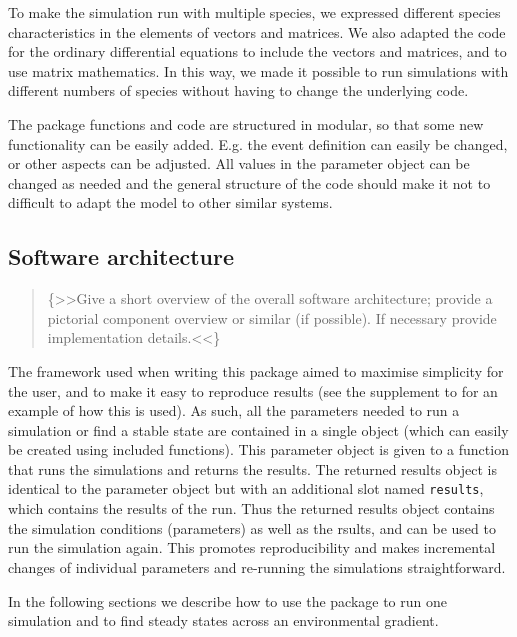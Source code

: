 \documentclass[]{elsarticle} %
\begin{document}
To make the simulation run with multiple species, we expressed different
species characteristics in the elements of vectors and matrices. We also
adapted the code for the ordinary differential equations to include the
vectors and matrices, and to use matrix mathematics. In this way, we
made it possible to run simulations with different numbers of species
without having to change the underlying code.

The package functions and code are structured in modular, so that some
new functionality can be easily added. E.g. the event definition can
easily be changed, or other aspects can be adjusted. All values in the
parameter object can be changed as needed and the general structure of
the code should make it not to difficult to adapt the model to other
similar systems.

\hypertarget{software-architecture}{%
\subsection{Software architecture}\label{software-architecture}}

\begin{quote}
\{\textgreater\textgreater Give a short overview of the overall software
architecture; provide a pictorial component overview or similar (if
possible). If necessary provide implementation
details.\textless\textless\}
\end{quote}

The framework used when writing this package aimed to maximise
simplicity for the user, and to make it easy to reproduce results (see
the supplement to \citet{Limberger2022} for an example of how this is
used). As such, all the parameters needed to run a simulation or find a
stable state are contained in a single object (which can easily be
created using included functions). This parameter object is given to a
function that runs the simulations and returns the results. The returned
results object is identical to the parameter object but with an
additional slot named \texttt{results}, which contains the results of
the run. Thus the returned results object contains the simulation
conditions (parameters) as well as the rsults, and can be used to run
the simulation again. This promotes reproducibility and makes
incremental changes of individual parameters and re-running the
simulations straightforward.

In the following sections we describe how to use the package to run one
simulation and to find steady states across an environmental gradient.
\end{document}
